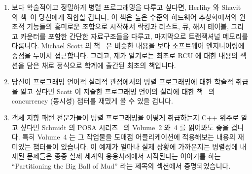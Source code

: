 \begin{enumerate}
\item	보다 학술적이고 정밀하게 병렬 프로그래밍을 다루고 싶다면, Herlihy 와
	Shavit 의 책~\cite{HerlihyShavit2008Textbook}이 당신에게 적합할 겁니다.
	이 책은 높은 수준의 하드웨어 추상화에서의 원초적 기능들의 흥미로운
	조합으로 시작해서 락킹과 리스트, 큐, 해시 테이블, 그리고 카운터를
	포함한 간단한 자료구조들을 다루고, 마지막으로 트랜잭셔널 메모리를
	다룹니다.
	Michael Scott 의 책~\cite{MichaelScott2013Textbook} 은 비슷한 내용을
	보다 소프트웨어 엔지니어링에 중점을 두어서 접근합니다.
	그리고, 제가 알기로는 최초로 RCU 에 대한 내용의 섹션을 담은 채로
	정식으로 학계에 출간된 최초의 책입니다.
\iffalse

\item	If you prefer a more academic and rigorous treatment of
	parallel programming,
	you might like Herlihy's and Shavit's
	textbook~\cite{HerlihyShavit2008Textbook}.
	This book starts with an interesting combination
	of low-level primitives at high levels of abstraction
	from the hardware, and works its way through locking
	and simple data structures including lists, queues,
	hash tables, and counters, culminating with transactional
	memory.
	Michael Scott's textbook~\cite{MichaelScott2013Textbook}
	approaches similar material with more of a
	software-engineering focus, and, as far as I know, is
	the first formally published academic textbook to include a
	section devoted to RCU.
\fi
\item	당신이 프로그래밍 언어적 실리적 관점에서의 병렬 프로그래밍에 대한
	학술적 취급을 알고 싶다면 Scott 이 저술한 프로그래밍 언어의 실리에 대한
	책~\cite{MichaelScott2006Textbook} 의 concurrency (동시성) 챕터를
	재밌게 볼 수 있을 겁니다.
\iffalse

\item	If you would like an academic treatment of parallel
	programming from a programming\-/language\-/pragmatics viewpoint,
	you might be interested in the concurrency chapter from Scott's
	textbook~\cite{MichaelScott2006Textbook}
	on programming-language pragmatics.
\fi
\item	객체 지향 패턴 전문가들이 병렬 프로그래밍을 어떻게 취급하는지 C++
	위주로 알고 싶다면 Schmidt 의 POSA
	시리즈~\cite{SchmidtStalRohnertBuschmann2000v2Textbook,
	BuschmannHenneySchmidt2007v4Textbook} 의 Volume~2 와~4 를 읽어봐도 좋을
	겁니다.
	특히 Volume~4 는 그 작업물을 도매점 어플리케이션에 적용해보는 내용의
	재미있는 챕터들이 있습니다.
	이 예제가 얼마나 실제 상황에 가까운지는 병렬성에 내재된 문제들은 종종
	실제 세계의 응용사례에서 시작된다는 이야기를 하는
	``Partitioning the Big Ball of Mud'' 라는 제목의 섹션에서
	증명되었습니다.
\iffalse


\end{enumerate}
